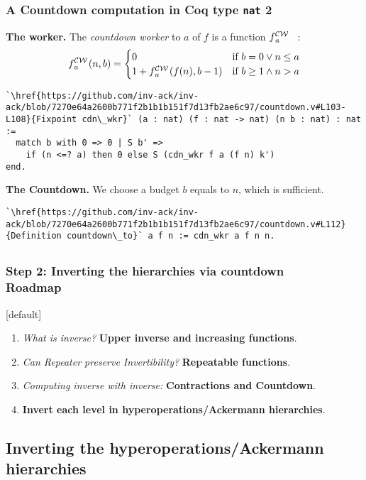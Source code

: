 \begin{frame}[fragile]
\frametitle{A Countdown computation in Coq type \texttt{nat} 2}

\textbf{The worker.}
The \emph{countdown worker}
to $a$ of $f$ is a function $\cdw{f}{a}$~~:
\begin{equation*}
\cdw{f}{a}(n, b) = \begin{cases}
0 & \text{if } b = 0 \vee n\le a \\ 1 +\cdw{f}{a}(f(n), b-1) & \text{if } b \ge 1 \wedge n > a
\end{cases}
\end{equation*}

\begin{lstlisting}
`\href{https://github.com/inv-ack/inv-ack/blob/7270e64a2600b771f2b1b1b151f7d13fb2ae6c97/countdown.v#L103-L108}{Fixpoint cdn\_wkr}` (a : nat) (f : nat -> nat) (n b : nat) : nat :=
  match b with 0 => 0 | S b' =>
    if (n <=? a) then 0 else S (cdn_wkr f a (f n) k')
end.
\end{lstlisting}

\bigskip

\textbf{The Countdown.} We choose a budget $b$ equals to $n$, which is sufficient.
\begin{lstlisting}
`\href{https://github.com/inv-ack/inv-ack/blob/7270e64a2600b771f2b1b1b151f7d13fb2ae6c97/countdown.v#L112}{Definition countdown\_to}` a f n := cdn_wkr a f n n.
\end{lstlisting}
\end{frame}




\subsection*{}
\begin{frame}
\frametitle{Step 2: Inverting the hierarchies via countdown\\ Roadmap}
[default]

\begin{enumerate}[\bfseries 1.]
	\itemsep 3ex
	\item<done@1->
	\emph{What is inverse?} \textbf{Upper inverse and increasing functions}.
	
	\item<done@1->
	\emph{Can Repeater preserve Invertibility?} \textbf{Repeatable functions}.
	
	\item<done@1->
	\emph{Computing inverse with inverse:} \textbf{Contractions and Countdown}.
	
	\item<come@2->
	\textbf{Invert each level in hyperoperations/Ackermann hierarchies}.
\end{enumerate}
\end{frame}


\subsection{Inverting the hyperoperations/Ackermann hierarchies}

